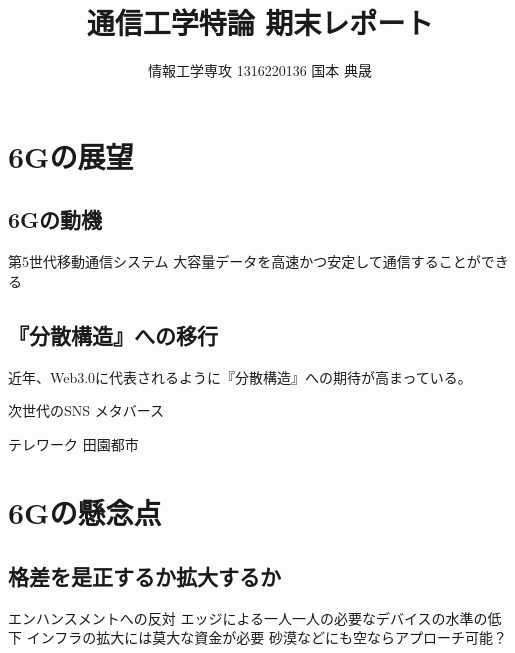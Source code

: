 \documentclass[a4paper,10pt,uplatex]{jsarticle}
\title{通信工学特論 期末レポート}
\author{情報工学専攻 1316220136 国本 典晟}
\date{}
\begin{document}
\maketitle

\section{6Gの展望}
\subsection{6Gの動機}
第5世代移動通信システム
大容量データを高速かつ安定して通信することができる

\subsection{『分散構造』への移行}
近年、Web3.0に代表されるように『分散構造』への期待が高まっている。

次世代のSNS
メタバース

テレワーク
田園都市

\section{6Gの懸念点}
\subsection{格差を是正するか拡大するか}
エンハンスメントへの反対
エッジによる一人一人の必要なデバイスの水準の低下
インフラの拡大には莫大な資金が必要
砂漠などにも空ならアプローチ可能？
\end{document}
